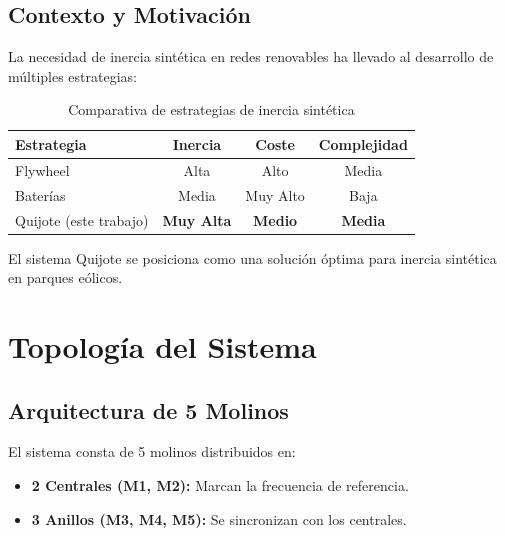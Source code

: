 \documentclass[12pt,a4paper]{article}
\begin{document}
\subsection{Contexto y Motivación}

La necesidad de inercia sintética en redes renovables ha llevado al desarrollo de múltiples estrategias:

\begin{table}[H]
\centering
\caption{Comparativa de estrategias de inercia sintética}
\label{tab:inercia}
\begin{tabular}{@{}lccc@{}}
\toprule
\textbf{Estrategia} & \textbf{Inercia} & \textbf{Coste} & \textbf{Complejidad} \\
\midrule
Flywheel & Alta & Alto & Media \\
Baterías & Media & Muy Alto & Baja \\
Quijote (este trabajo) & \textbf{Muy Alta} & \textbf{Medio} & \textbf{Media} \\
\bottomrule
\end{tabular}
\end{table}

El sistema Quijote se posiciona como una solución óptima para inercia sintética en parques eólicos.

\section{Topología del Sistema}

\subsection{Arquitectura de 5 Molinos}

El sistema consta de 5 molinos distribuidos en:

\begin{itemize}
    \item \textbf{2 Centrales (M1, M2):} Marcan la frecuencia de referencia.
    \item \textbf{3 Anillos (M3, M4, M5):} Se sincronizan con los centrales.
\end{itemize}
\end{document}
